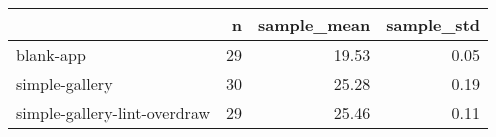 \begin{tabular}{lrrr}
\toprule
{} &   n &  sample\_mean &  sample\_std \\
\midrule
blank-app                    &  29 &        19.53 &        0.05 \\
simple-gallery               &  30 &        25.28 &        0.19 \\
simple-gallery-lint-overdraw &  29 &        25.46 &        0.11 \\
\bottomrule
\end{tabular}
